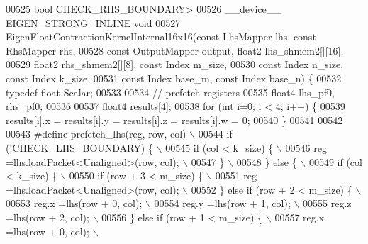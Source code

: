 \begin{DoxyCode}
00525          \textcolor{keywordtype}{bool} CHECK\_RHS\_BOUNDARY>
00526 \_\_device\_\_ EIGEN\_STRONG\_INLINE \textcolor{keywordtype}{void}
00527 EigenFloatContractionKernelInternal16x16(\textcolor{keyword}{const} LhsMapper lhs, \textcolor{keyword}{const} RhsMapper rhs,
00528                        \textcolor{keyword}{const} OutputMapper output, float2 lhs\_shmem2[][16],
00529                        float2 rhs\_shmem2[][8], \textcolor{keyword}{const} Index m\_size,
00530                        \textcolor{keyword}{const} Index n\_size, \textcolor{keyword}{const} Index k\_size,
00531                        \textcolor{keyword}{const} Index base\_m, \textcolor{keyword}{const} Index base\_n) \{
00532   \textcolor{keyword}{typedef} \textcolor{keywordtype}{float} Scalar;
00533 
00534   \textcolor{comment}{// prefetch registers}
00535   float4 lhs\_pf0, rhs\_pf0;
00536 
00537   float4 results[4];
00538   \textcolor{keywordflow}{for} (\textcolor{keywordtype}{int} i=0; i < 4; i++) \{
00539     results[i].x = results[i].y = results[i].z = results[i].w = 0;
00540   \}
00541 
00542 
00543 \textcolor{preprocessor}{#define prefetch\_lhs(reg, row, col)                   \(\backslash\)}
00544 \textcolor{preprocessor}{    if (!CHECK\_LHS\_BOUNDARY) \{                        \(\backslash\)}
00545 \textcolor{preprocessor}{      if (col < k\_size) \{                             \(\backslash\)}
00546 \textcolor{preprocessor}{        reg =lhs.loadPacket<Unaligned>(row, col);     \(\backslash\)}
00547 \textcolor{preprocessor}{      \}                                               \(\backslash\)}
00548 \textcolor{preprocessor}{    \} else \{                                          \(\backslash\)}
00549 \textcolor{preprocessor}{      if (col < k\_size) \{                             \(\backslash\)}
00550 \textcolor{preprocessor}{        if (row + 3 < m\_size) \{                       \(\backslash\)}
00551 \textcolor{preprocessor}{          reg =lhs.loadPacket<Unaligned>(row, col);   \(\backslash\)}
00552 \textcolor{preprocessor}{        \} else if (row + 2 < m\_size) \{                \(\backslash\)}
00553 \textcolor{preprocessor}{          reg.x =lhs(row + 0, col);                   \(\backslash\)}
00554 \textcolor{preprocessor}{          reg.y =lhs(row + 1, col);                   \(\backslash\)}
00555 \textcolor{preprocessor}{          reg.z =lhs(row + 2, col);                   \(\backslash\)}
00556 \textcolor{preprocessor}{        \} else if (row + 1 < m\_size) \{                \(\backslash\)}
00557 \textcolor{preprocessor}{          reg.x =lhs(row + 0, col);                   \(\backslash\)}

\end{DoxyCode}
